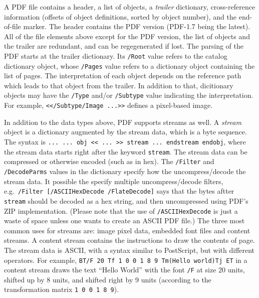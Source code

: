 \documentclass{ltugproc}
\begin{document}
A PDF file contains a header, a list of objects, a \emph{trailer}
dictionary, cross-reference information (offsets of object definitions,
sorted by object number), and the end-of-file marker. The header contains
the PDF version (PDF-1.7 being the latest). All of the file elements above
except for the PDF version, the list of objects and the trailer are
redundant, and can be regegenerated if lost. The parsing of the PDF starts
at the trailer dictionary. Its \texttt{/Root} value refers to the catalog
dictionary object, whose \texttt{/Pages} value refers to a dictionary object
containing the list of pages. The interpretation of each object depends on
the reference path which leads to that object from the trailer. In addition
to that, dicitionary objects may have the \texttt{/Type} and/or
\texttt{/Subtype} value indicating the interpretation. For example,
\texttt{\hbox{<}</Subtype/Image ...\hbox{>}>} defines a pixel-based image.

In addition to the data types above, PDF supports streams as well. A
\emph{stream} object is a dictionary augmented by the stream data, which is
a byte sequence. The syntax is \texttt{... ... obj << ... >> stream ...
endstream endobj}, where the stream data starts right after the keyword
\texttt{stream}. The stream data can be compressed or otherwise encoded
(such as in hex). The \texttt{/Filter} and \texttt{/DecodeParms} values in
the dictionary specify how the uncompress/\allowbreak decode the stream data.
It possible the specify multiple uncompress/\allowbreak decode filters,
e.g.\ \texttt{/Filter [/ASCIIHexDecode /FlateDecode]} says that the bytes
aftter \texttt{stream} should be decoded as a hex string, and then
uncompressed using PDF's ZIP implementation. (Please note that the use of
\texttt{/ASCIIHexDecode} is just a waste of space unless one wants to create
an ASCII PDF file.) The three most common uses for
streams are: image pixel data, embedded font files and content streams.
A content stream contains the instructions to draw the contents of page. The
stream data is ASCII, with a syntax similar to PostScript, but with
different operators. For example, \texttt{BT/F 20 Tf 1 0 0 1 8 9
Tm(Hello world)Tj ET} in a content stream draws the text ``Hello World''
with the font \texttt{/F} at size 20 units, shifted up by 8 units, and
shifted right by 9 units (according to the transformation matrix
\texttt{1 0 0 1 8 9}).
\end{document}
